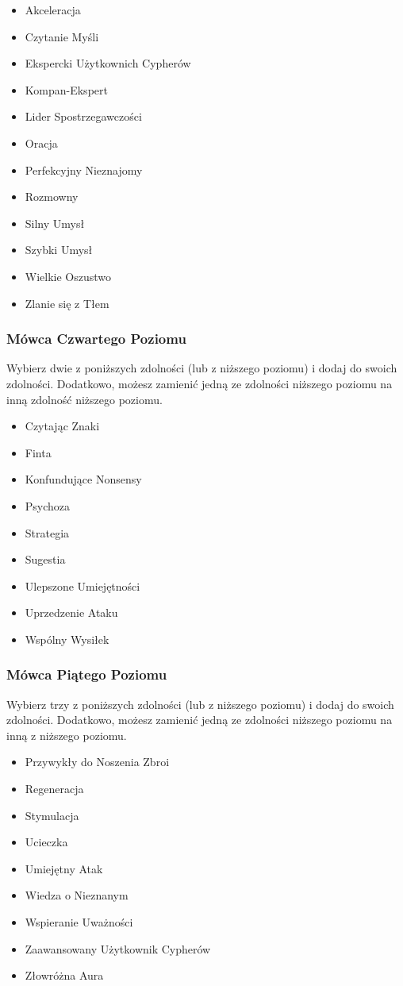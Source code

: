 \begin{itemize}
\item Akceleracja
\item Czytanie Myśli
\item Ekspercki Użytkownich Cypherów 
\item Kompan-Ekspert
\item Lider Spostrzegawczości
\item Oracja
\item Perfekcyjny Nieznajomy
\item Rozmowny
\item Silny Umysł
\item Szybki Umysł
\item Wielkie Oszustwo
\item Zlanie się z Tłem
\end{itemize}

\subsubsection{Mówca Czwartego Poziomu}

Wybierz dwie z poniższych zdolności (lub z niższego poziomu) i dodaj do swoich zdolności. Dodatkowo, możesz zamienić jedną ze zdolności niższego poziomu na inną zdolność niższego poziomu.

\begin{itemize}
\item Czytając Znaki
\item Finta
\item Konfundujące Nonsensy
\item Psychoza
\item Strategia
\item Sugestia
\item Ulepszone Umiejętności
\item Uprzedzenie Ataku
\item Wspólny Wysiłek
\end{itemize}

\subsubsection{Mówca Piątego Poziomu}

Wybierz trzy z poniższych zdolności (lub z niższego poziomu) i dodaj do swoich zdolności. Dodatkowo, możesz zamienić jedną ze zdolności niższego poziomu na inną z niższego poziomu.

\begin{itemize}
\item Przywykły do Noszenia Zbroi
\item Regeneracja
\item Stymulacja
\item Ucieczka
\item Umiejętny Atak
\item Wiedza o Nieznanym
\item Wspieranie Uważności
\item Zaawansowany Użytkownik Cypherów
\item Złowróżna Aura
\end{itemize}

